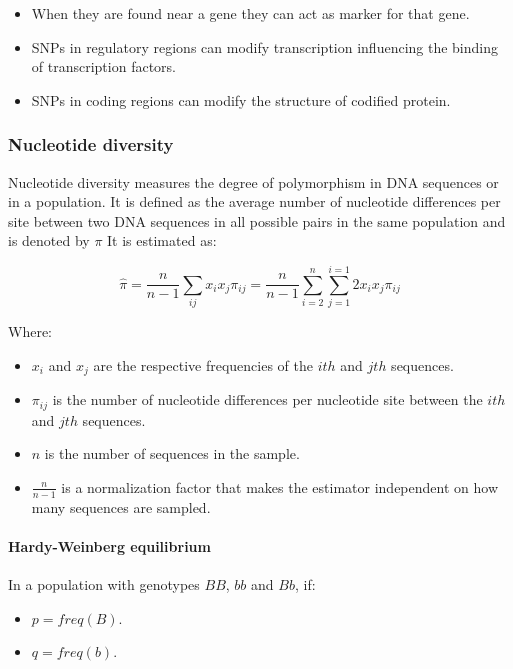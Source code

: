 		\begin{multicols}{2}
			\begin{itemize}
				\item When they are found near a gene they can act as marker for that gene.
				\item SNPs in regulatory regions can modify transcription influencing the binding of transcription factors.
				\item SNPs in coding regions can modify the structure of codified protein.
			\end{itemize}
		\end{multicols}

		\subsubsection{Nucleotide diversity}
		Nucleotide diversity measures the degree of polymorphism in DNA sequences or in a population.
		It is defined as the average number of nucleotide differences per site between two DNA sequences in all possible pairs in the same population and is denoted by $\pi$
		It is estimated as:

		$$\hat{\pi} = \frac{n}{n-1}\sum\limits_{ij} x_ix_j\pi_{ij} = \frac{n}{n-1} \sum\limits_{i=2}^n\sum\limits_{j=1}^{i=1}2x_ix_j\pi_{ij}$$

		Where:

		\begin{multicols}{2}
			\begin{itemize}
				\item $x_i$ and $x_j$ are the respective frequencies of the $ith$ and $jth$ sequences.
				\item	$\pi_{ij}$ is the number of nucleotide differences per nucleotide site between the $ith$ and $jth$ sequences.
				\item $n$ is the number of sequences in the sample.
				\item $\frac{n}{n-1}$ is a normalization factor that makes the estimator independent on how many sequences are sampled.
			\end{itemize}
		\end{multicols}

			\paragraph{Hardy-Weinberg equilibrium}
			In a population with genotypes $BB$, $bb$ and $Bb$, if:

			\begin{multicols}{2}
				\begin{itemize}
					\item $p = freq(B)$.
					\item $q = freq(b)$.
				\end{itemize}
			\end{multicols}

